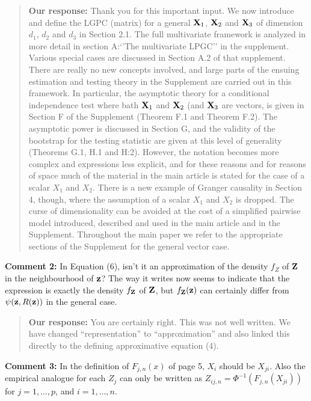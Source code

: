 \documentclass[
  12pt,
  letterpaper]{article}
\numberwithin{equation}{section}
\begin{document}
\begin{quote}
\textbf{Our response:} Thank you for this important input. We now introduce and define the LGPC (matrix) for a general \({\bf X}_1\), \({\bf X}_2\) and \({\bf X}_3\) of dimension \(d_1\), \(d_2\) and \(d_3\) in Section 2.1. The full multivariate framework is analyzed in more detail in section A:`'The multivariate LPGC'' in the supplement. Various special cases are discussed in Section A.2 of that supplement. There are really no new concepts involved, and large parts of the ensuing estimation and testing theory in the Supplement are carried out in this framework. In particular, the asymptotic theory for a conditional independence test where bath \({\bf X}_1\) and \({\bf X}_2\) (and \({\bf X}_3\) are vectors, is given in Section F of the Supplement (Theorem F.1 and Theorem F.2). The asymptotic power is discussed in Section G, and the validity of the bootstrap for the testing statistic are given at this level of generality (Theorems G.1, H.1 and H:2). However, the notation becomes more complex and expressions less explicit, and for these reasons and for reasons of space much of the material in the main article is stated for the case of a scalar \(X_1\) and \(X_2\). There is a new example of Granger causality in Section 4, though, where the assumption of a scalar \(X_1\) and \(X_2\) is dropped. The curse of dimensionality can be avoided at the cost of a simplified pairwise model introduced, described and used in the main article and in the Supplement. Throughout the main paper we refer to the appropriate sections of the Supplement for the general vector case.
\end{quote}

\textbf{Comment 2:} In Equation (6), isn't it an approximation of the density \(f_Z\) of \({\bf Z}\) in the neighbourhood of \({\bf z}\)? The way it writes now seems to indicate that the expression is exactly the density \(f_{\bf Z}\) of \({\bf Z}\), but \(f_{\bf Z}({\bf z})\) can certainly differ from \(\psi({\bf z}, R({\bf z}))\) in the general case.

\begin{quote}
\textbf{Our response:} You are certainly right. This was not well written. We have changed ``representation'' to ``approximation'' and also linked this directly to the defining approximative equation (4).
\end{quote}

\textbf{Comment 3:} In the definition of \(F_{j,n}(x)\) of page 5, \(X_i\) should be \(X_{ji}\). Also the empirical analogue for each \(Z_j\) can only be written as \(Z_{ij,n} = \Phi^{-1}(F_{j,n}(X_{ji}))\) for \(j=1,\ldots,p\), and \(i=1,\ldots,n\).
\end{document}
